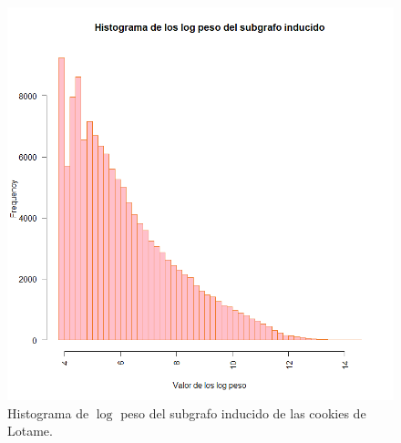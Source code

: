 \begin{figure}[!ht]
\includegraphics[width=1\textwidth]{Tesis/Figures/HistSubgrafoInducido.png}
\caption{Histograma de $\log$ peso del subgrafo inducido de las cookies de Lotame.}
\centering
\end{figure}
\clearpage

